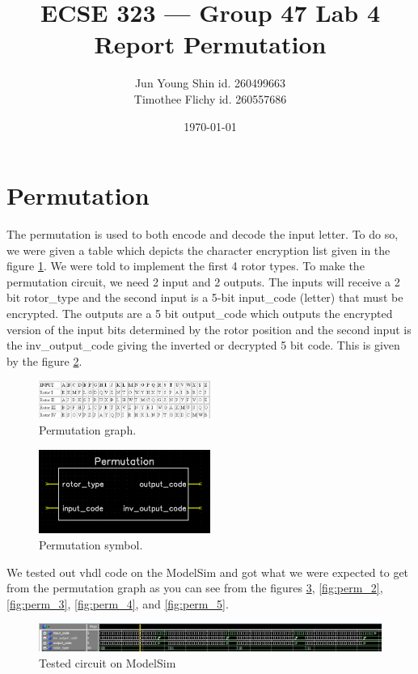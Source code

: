 \documentclass[10pt]{article}
\title{ECSE 323 --- Group 47 Lab 4 Report Permutation}
\author{Jun Young Shin id. 260499663\\ Timothee Flichy id. 260557686}
\date{\today}
\begin{document}
\maketitle
\section{Permutation}
The permutation is used to both encode and decode the input letter. To do so, we were given a table which depicts the character encryption list given in the figure \ref{fig:permuation}. We were told to implement the first 4 rotor types. To make the permutation circuit, we need 2 input and 2 outputs. The inputs will receive a 2 bit rotor\_type and the second input is a 5-bit input\_code (letter) that must be encrypted. The outputs are a 5 bit output\_code which outputs the encrypted version of the input bits determined by the rotor position and the second input is the inv\_output\_code giving the inverted or decrypted 5 bit code. This is given by the figure \ref{fig:permuation_sym}.
\begin{figure}[!htb]
    \centering
    \includegraphics[width=0.5\textwidth]{./permutation.png}
    \caption{Permutation graph.}
    \label{fig:permuation}
\end{figure}
\begin{figure}[!htb]
    \centering
    \includegraphics[width=0.5\textwidth]{./permutation_circuit.png}
    \caption{Permutation symbol.}
    \label{fig:permuation_sym}
\end{figure}
We tested out vhdl code on the ModelSim and got what we were expected to get from the permutation graph as you can see from the figures \ref{fig:perm_1}, \ref{fig:perm_2}, \ref{fig:perm_3}, \ref{fig:perm_4}, and \ref{fig:perm_5}.
\begin{figure}[!htb]
    \centering
    \includegraphics[width=1\textwidth]{./perm_1.png}
    \caption{Tested circuit on ModelSim}
    \label{fig:perm_1}
\end{figure}
\end{document}
